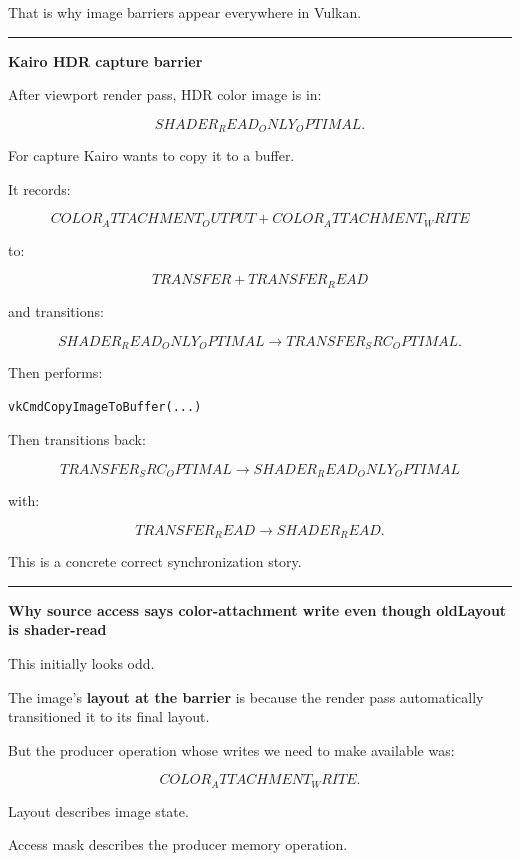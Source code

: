 That is why image barriers appear everywhere in Vulkan.

\begin{center}\rule{0.5\linewidth}{0.5pt}\end{center}

\textbf{Kairo HDR capture barrier}

After viewport render pass, HDR color image is in:

\[
SHADER_READ_ONLY_OPTIMAL.
\]

For capture Kairo wants to copy it to a buffer.

It records:

\[
COLOR_ATTACHMENT_OUTPUT
+
COLOR_ATTACHMENT_WRITE
\]

to:

\[
TRANSFER
+
TRANSFER_READ
\]

and transitions:

\[
SHADER_READ_ONLY_OPTIMAL
\rightarrow
TRANSFER_SRC_OPTIMAL.
\]

Then performs:

\begin{verbatim}
vkCmdCopyImageToBuffer(...)
\end{verbatim}

Then transitions back:

\[
TRANSFER_SRC_OPTIMAL
\rightarrow
SHADER_READ_ONLY_OPTIMAL
\]

with:

\[
TRANSFER_READ
\rightarrow
SHADER_READ.
\]

This is a concrete correct synchronization story.

\begin{center}\rule{0.5\linewidth}{0.5pt}\end{center}

\textbf{Why source access says color-attachment write even though oldLayout is shader-read}

This initially looks odd.

The image's \textbf{layout at the barrier} is  because the render pass automatically transitioned it to its final layout.

But the producer operation whose writes we need to make available was:

\[
COLOR_ATTACHMENT_WRITE.
\]

Layout describes image state.

Access mask describes the producer memory operation.

